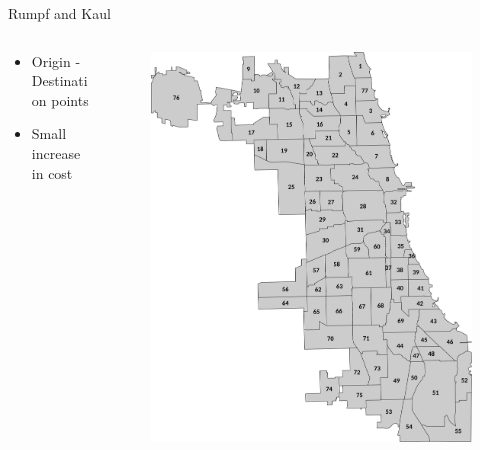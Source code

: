 \documentclass[9pt, aspectratio=43, english]{beamer}
\begin{document}
\begin{frame}{Rumpf and Kaul}
  \begin{columns}
    \begin{column}{0.48\textwidth}
      \begin{itemize}
        \item Origin - Destination points
        \item Small increase in cost
      \end{itemize}
    \end{column}

    \begin{column}{0.48\textwidth}
    \begin{figure}
      \centering
      \includegraphics[width=\textwidth]{Chicago_Community_Areas.png}
    \end{figure}
    \end{column}
  \end{columns}
\end{frame}
\end{document}
